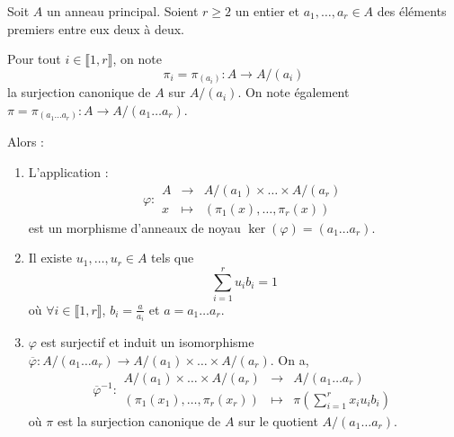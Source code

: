 






  Soit $A$ un anneau principal. Soient $r \geq 2$ un entier et $a_1, \dots, a_r \in A$ des éléments premiers entre eux deux à deux.

  \begin{notation}
    Pour tout $i \in \llbracket 1, r \rrbracket$, on note
    \[ \pi_i = \pi_{(a_i)} : A \rightarrow A/(a_i) \]
    la surjection canonique de $A$ sur $A/(a_i)$. On note également $\pi = \pi_{(a_1 \dots a_r)} : A \rightarrow A/(a_1 \dots a_r)$.
  \end{notation}

  \begin{theorem}
    \label{theoreme-chinois-1}
    Alors :
    \begin{enumerate}[label={\bfseries(\roman*)}]
      \item L'application :
      \[
        \varphi :
        \begin{array}{ccc}
          A &\rightarrow& A/(a_1) \times \dots \times A/(a_r) \\
          x &\mapsto& (\pi_1(x), \dots, \pi_r(x))
        \end{array}
      \]
      est un morphisme d'anneaux de noyau $\ker(\varphi) = (a_1 \dots a_r)$.
      \item Il existe $u_1, \dots, u_r \in A$ tels que
      \[ \sum_{i=1}^{r} u_i b_i = 1 \]
      où $\forall i \in \llbracket 1, r \rrbracket$, $b_i = \frac{a}{a_i}$ et $a = a_1 \dots a_r$.
      \item $\varphi$ est surjectif et induit un isomorphisme $\overline{\varphi} : A/(a_1 \dots a_r) \rightarrow A/(a_1) \times \dots \times A/(a_r)$. On a,
      \[
        \overline{\varphi}^{-1} :
        \begin{array}{ccc}
          A/(a_1) \times \dots \times A/(a_r) &\rightarrow& A/(a_1 \dots a_r) \\
          (\pi_1(x_1), \dots, \pi_r(x_r)) &\mapsto& \pi \left( \sum_{i=1}^{r} x_i u_i b_i \right)
        \end{array}
      \]
      où $\pi$ est la surjection canonique de $A$ sur le quotient $A/(a_1 \dots a_r)$.
    \end{enumerate}
  \end{theorem}

